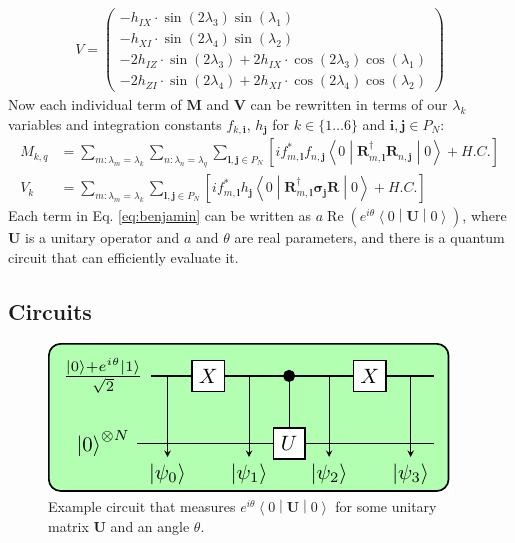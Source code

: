 \documentclass{aux/ttuthes2007}
\newcommand{\sandwich}[3]{\left< #1 \middle\vert #2 \middle\vert #3 \right>}
\newcommand{\s}[1]{\sin\left( #1 \right)}
\newcommand{\co}[1]{\cos\left( #1 \right)}
\newcommand{\paren}[1]{\left( #1 \right)}
\newcommand{\elec}{N}
\begin{document}
\begin{equation*}
	\begin{split}
		V = \begin{pmatrix}
		-	h_{IX} \cdot \s  {2 \lambda_3} \s  {\lambda_1}
%
	\\
		-	h_{XI} \cdot \s  {2 \lambda_4} \s  {\lambda_2}
%
	\\
%
%
		-	2 h_{IZ} \cdot \s  {2 \lambda_3}
		+	2 h_{IX} \cdot \co {2 \lambda_3} \co {\lambda_1}
%
	\\
%
		-	2 h_{ZI} \cdot \s  {2 \lambda_4}
		+	2 h_{XI} \cdot \co {2 \lambda_4} \co {\lambda_2}
		\end{pmatrix}
	\end{split}
\end{equation*}
%
Now each individual term of $\bm M$ and $\bm V$ can be rewritten in terms of our $\lambda_k$ variables and integration constants $f_{k, \bm i}$, $h_{\bm j}$ for $k \in \{1 \ldots 6\}$ and $\bm i, \bm j \in P_\elec$:
%
\begin{equation}\label{eq:benjamin}
\begin{split}
	M_{k, q} 
	&= \sum_{m:\lambda_m=\lambda_k} \sum_{n:\lambda_n=\lambda_q} \sum_{\bm l, \bm j \in P_\elec}
	\left[
		if_{m, \bm l}^*f_{n, \bm j}\sandwich 0 {\bm R_{m, \bm l}^\dagger \bm R_{n, \bm j}} 0
		+ H.C.
	\right]\\
	V_{k} 
	&= \sum_{m:\lambda_m=\lambda_k} \sum_{\bm l, \bm j \in P_\elec}
	\left[
		if_{m, \bm l}^*h_{\bm j}\sandwich 0 {\bm R_{m, \bm l}^\dagger \bm \sigma_{\bm j} \bm R} 0
		+ H.C.
	\right]
\end{split}
\end{equation}
%
Each term in Eq. \ref{eq:benjamin} can be written as $a\operatorname{Re}\paren{e^{i\theta}\sandwich 0 {\bm U} 0}$, 
where $\bm U$ is a unitary operator and $a$ and $\theta$ are real parameters,
and there is a quantum circuit that can efficiently evaluate it.
%
\subsection{\textbf{Circuits}}

\begin{figure}[hb]
  \includegraphics[width=\linewidth]{circuits/circuit1.pdf}
  \caption[Example reduced circuit]{Example circuit that measures $e^{i\theta}\sandwich{0}{\bm U}{0}$ for some unitary matrix $\bm U$ and an angle $\theta$.}
  \label{fig:circuitreal}
\end{figure}
\end{document}
